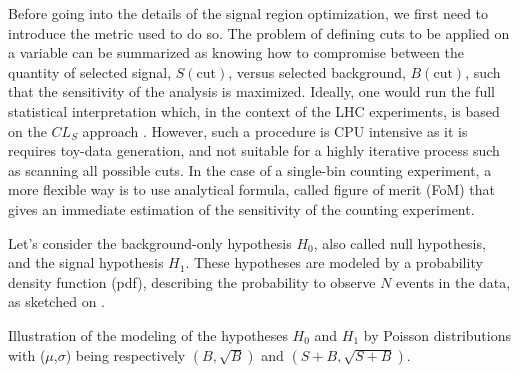     Before going into the details of the signal region optimization, we first
    need to introduce the metric used to do so. The problem of defining cuts to
    be applied on a variable can be summarized as knowing how to compromise
    between the quantity of selected signal, $S(\text{cut})$, versus selected
    background, $B(\text{cut})$, such that the sensitivity of the analysis is
    maximized. Ideally, one would run the full statistical interpretation which,
    in the context of the LHC experiments, is based on the $CL_S$ approach
    \cite{CLs}. However, such a procedure is CPU intensive as it is requires
    toy-data generation, and not suitable for a highly iterative process such as
    scanning all possible cuts. In the case of a single-bin counting experiment,
    a more flexible way is to use analytical formula, called figure of merit
    (FoM) that gives an immediate estimation of the sensitivity of the counting
    experiment.

    Let's consider the background-only hypothesis $H_0$, also called null
    hypothesis, and the signal hypothesis $H_1$. These hypotheses are modeled by
    a probability density function (pdf), describing the probability to observe
    $N$ events in the data, as sketched on .

                 {Illustration of the modeling of the hypotheses $H_0$ and $H_1$
                 by Poisson distributions with ($\mu$,$\sigma$) being respectively
                 $(B,\sqrt{B})$ and $(S+B,\sqrt{S+B})$.}

